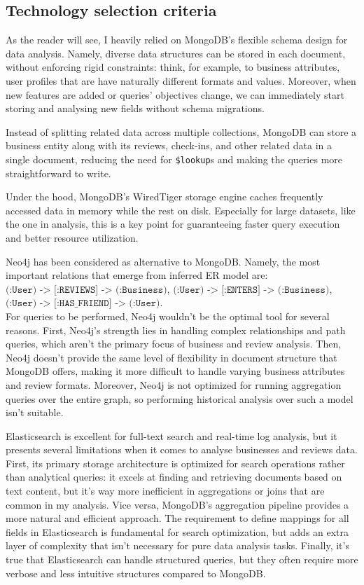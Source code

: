 \documentclass{Configuration_Files/PoliMi3i_thesis}
\begin{document}
\subsection{Technology selection criteria}
As the reader will see, I heavily relied on MongoDB's flexible schema design for data analysis. Namely, diverse data structures can be stored in each document, without enforcing rigid constraints: think, for example, to business attributes, user profiles that are have naturally different formats and values. Moreover, when new features are added or queries' objectives change, we can immediately start storing and analysing new fields without schema migrations.

Instead of splitting related data across multiple collections, MongoDB can store a business entity along with its reviews, check-ins, and other related data in a single document, reducing the need for \texttt{\$lookup}s and making the queries more straightforward to write. 

Under the hood, MongoDB's WiredTiger storage engine caches frequently accessed data in memory while the rest on disk. Especially for large datasets, like the one in analysis, this is a key point for guaranteeing faster query execution and better resource utilization.


Neo4j has been considered as alternative to MongoDB. Namely, the most important relations that emerge from inferred ER model are: $\texttt{(:User) -> [:REVIEWS] -> (:Business)}$,  $\texttt{(:User) -> [:ENTERS] -> (:Business)}$,  $\texttt{(:User) -> [:HAS\_FRIEND] -> (:User)}$. \\ For queries to be performed, Neo4j wouldn't be the optimal tool for several reasons. First, Neo4j's strength lies in handling complex relationships and path queries, which aren't the primary focus of business and review analysis. Then, Neo4j doesn't provide the same level of flexibility in document structure that MongoDB offers, making it more difficult to handle varying business attributes and review formats. Moreover, Neo4j is not optimized for running aggregation queries over the entire graph, so performing historical analysis over such a model isn't suitable.


Elasticsearch is excellent for full-text search and real-time log analysis, but it presents several limitations when it comes to analyse businesses and reviews data. First, its primary storage architecture is optimized for search operations rather than analytical queries: it excels at finding and retrieving documents based on text content, but it's way more inefficient in aggregations or joins that are common in my analysis. Vice versa, MongoDB's aggregation pipeline provides a more natural and efficient approach. 
The requirement to define mappings for all fields in Elasticsearch is fundamental for search optimization, but adds an extra layer of complexity that isn't necessary for pure data analysis tasks.
Finally, it's true that Elasticsearch can handle structured queries, but they often require more verbose and less intuitive structures compared to MongoDB.
\end{document}
